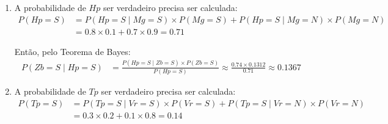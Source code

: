 \documentclass{article}
\newenvironment{arabenum}{
    \begin{enumerate}[label=\textbf{\arabic*})]
}{
    \end{enumerate}
}
\begin{document}
\begin{arabenum}
    \item A probabilidade de $Hp$ ser verdadeiro precisa ser calculada:
        \begin{align*}
            P(Hp = S) & =
                P(Hp = S \mid Mg = S) \times P(Mg = S)
                + P(Hp = S \mid Mg = N) \times P(Mg = N) \\
            & = 0.8 \times 0.1 + 0.7 \times 0.9 = 0.71
        \end{align*}

        Então, pelo Teorema de Bayes:
        \begin{align*}
            P(Zb = S \mid Hp = S) & =
                \frac{P(Hp = S \mid Zb = S) \times P(Zb = S)}{P(Hp = S)}
                \approx \frac{0.74 \times 0.1312}{0.71} \approx \boldsymbol{0.1367}
        \end{align*}

    \item A probabilidade de $Tp$ ser verdadeiro precisa ser calculada:
        \begin{align*}
            P(Tp = S) & =
                P(Tp = S \mid Vr = S) \times P(Vr = S)
                + P(Tp = S \mid Vr = N) \times P(Vr = N) \\
            & = 0.3 \times 0.2 + 0.1 \times 0.8 = 0.14
        \end{align*}


\end{arabenum}
\end{document}
